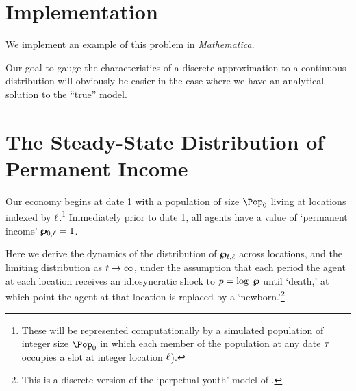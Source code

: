 \documentclass[\econtexRoot/BufferStockTheory.tex]{subfiles}
\begin{document}
\Biggen
\section{Implementation}

We implement an example of this problem in \emph{Mathematica}.

Our goal to gauge the characteristics of a discrete approximation to a continuous distribution will obviously be easier in the case where we have an analytical solution to the ``true'' model.



\section{The Steady-State Distribution of Permanent Income}


Our economy begins at date 1 with a population of size $\Pop_{0}$ living at locations indexed by  $\ell$.\footnote{These will be represented computationally by a simulated population of integer size $\Pop_{0}$ in which each member of the population at any date $\tau$ occupies a slot at integer location $\ell$).}  Immediately prior to date 1, all agents have a value of `permanent income' $\pmb{\wp}_{0,\ell}=1$. 

Here we derive the dynamics of the distribution of $\pmb{\wp}_{t,\ell}$ across locations, and the limiting distribution as $t \rightarrow \infty$, under the assumption that each period the agent at each location receives an idiosyncratic shock to $p = \log ~ \pmb{\wp}$ until `death,' at which point the agent at that location is replaced by a `newborn.'\footnote{This is a discrete version of the `perpetual youth' model of  \cite{blanchardFinite}.} %
\end{document}
